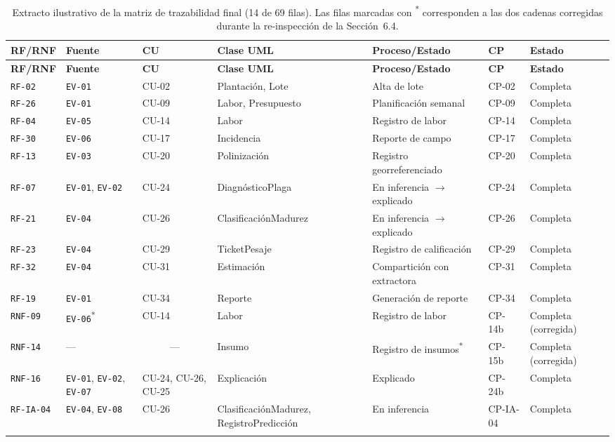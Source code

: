\documentclass[11pt,a4paper]{article}
\newcommand{\id}[1]{\texttt{#1}}
\begin{document}
{\small
\begin{longtable}{|C{1.4cm}|C{1.3cm}|C{1.3cm}|C{1.9cm}|C{1.6cm}|C{1.3cm}|C{1.5cm}|}
\hline
{}\textbf{RF/RNF} & \textbf{Fuente} & \textbf{CU} & \textbf{Clase UML} &
\textbf{Proceso/Estado} & \textbf{CP} & \textbf{Estado} \\
\hline
\endfirsthead
\hline
{}\textbf{RF/RNF} & \textbf{Fuente} & \textbf{CU} & \textbf{Clase UML} &
\textbf{Proceso/Estado} & \textbf{CP} & \textbf{Estado} \\
\hline
\endhead
\id{RF-02} & \id{EV-01} & CU-02 & Plantación, Lote & Alta de lote & CP-02 & Completa \\ \hline
\id{RF-26} & \id{EV-01} & CU-09 & Labor, Presupuesto & Planificación semanal & CP-09 & Completa \\
\hline
\id{RF-04} & \id{EV-05} & CU-14 & Labor & Registro de labor & CP-14 & Completa \\ \hline
\id{RF-30} & \id{EV-06} & CU-17 & Incidencia & Reporte de campo & CP-17 & Completa \\ \hline
\id{RF-13} & \id{EV-03} & CU-20 & Polinización & Registro georreferenciado & CP-20 & Completa \\
\hline
\id{RF-07} & \id{EV-01}, \id{EV-02} & CU-24 & DiagnósticoPlaga & En inferencia $\to$ explicado &
CP-24 & Completa \\ \hline
\id{RF-21} & \id{EV-04} & CU-26 & ClasificaciónMadurez & En inferencia $\to$ explicado & CP-26 &
Completa \\ \hline
\id{RF-23} & \id{EV-04} & CU-29 & TicketPesaje & Registro de calificación & CP-29 & Completa \\
\hline
\id{RF-32} & \id{EV-04} & CU-31 & Estimación & Compartición con extractora & CP-31 & Completa \\
\hline
\id{RF-19} & \id{EV-01} & CU-34 & Reporte & Generación de reporte & CP-34 & Completa \\ \hline
\id{RNF-09} & \id{EV-06}\textsuperscript{*} & CU-14 & Labor & Registro de labor & CP-14b &
Completa (corregida) \\ \hline
\id{RNF-14} & --- &  & Insumo & Registro de insumos\textsuperscript{*} &
CP-15b & Completa (corregida) \\ \hline
\id{RNF-16} & \id{EV-01}, \id{EV-02}, \id{EV-07} & CU-24, CU-26, CU-25 & Explicación & Explicado &
CP-24b & Completa \\ \hline
\id{RF-IA-04} & \id{EV-04}, \id{EV-08} & CU-26 & ClasificaciónMadurez, RegistroPredicción &
En inferencia & CP-IA-04 & Completa \\ \hline
\caption{Extracto ilustrativo de la matriz de trazabilidad final (14 de 69 filas). Las filas
marcadas con \textsuperscript{*} corresponden a las dos cadenas corregidas durante la re-inspección
de la Sección~6.4.}
\label{tab:extracto-matriz}
\end{longtable}}
\end{document}
